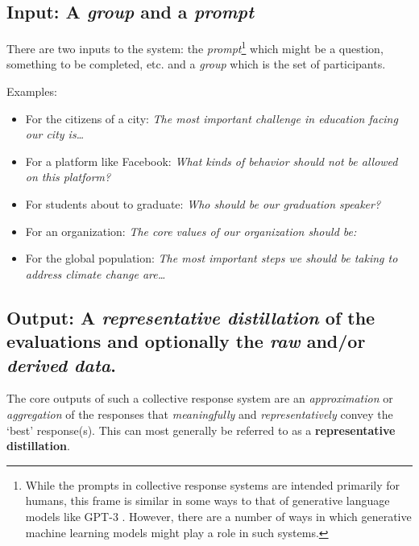 \documentclass[sigconf,authorversion,nonacm,linkcolor=blue,colorlinks]{acmart}
\def\tightlist{} %
\begin{document}
\hypertarget{input}{%
\subsection{\textbf{Input}: A \emph{group} and a \emph{prompt}}\label{input}}

There are two inputs to the system: the \emph{prompt}\footnote{While the prompts in collective response systems are intended primarily for humans, this frame is similar in some ways to that of generative language models like GPT-3 \cite{brown2020GPT3LanguageModelsAre}. However, there are a number of ways in which generative machine learning models might play a role in such systems.} which might be a question, something to be completed, etc. and a \emph{group} which is the set of participants.

\begin{example}
\hypertarget{examples}{%
Examples:\label{examples}}

\begin{itemize}
\tightlist
\item
  For the citizens of a city: \emph{The most important challenge in education facing our city is\ldots{}}
\item
  For a platform like Facebook: \emph{What kinds of behavior should not be allowed on this platform?}
\item
  For students about to graduate: \emph{Who should be our graduation speaker?}
\item
  For an organization: \emph{The core values of our organization should be:}
\item
  For the global population: \emph{The most important steps we should be taking to address climate change are\ldots{}}
\end{itemize}
    
\end{example}



\hypertarget{output}{%
\subsection{\textbf{Output}: A \emph{representative distillation} of the evaluations and optionally the \emph{raw} and/or \emph{derived data}.\label{output}}}


The core outputs of such a collective response system are an \emph{approximation} or \emph{aggregation} of the responses that \emph{meaningfully} and \emph{representatively} convey the `best' response(s). This can most generally be referred to as a \textbf{representative distillation}.
\end{document}
